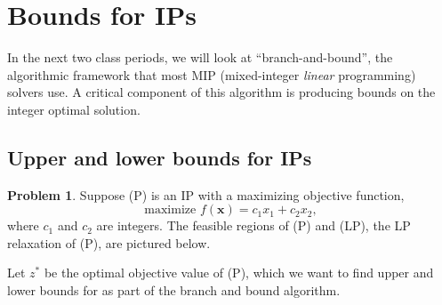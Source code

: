 \documentclass[11pt]{article}
\theoremstyle{definition}
\newtheorem{problem}{Problem}
\begin{document}
\section{Bounds for IPs}

In the next two class periods, we will look at ``branch-and-bound'', the algorithmic framework that most MIP (mixed-integer \emph{linear} programming) solvers use.  A critical component of this algorithm is producing bounds on the integer optimal solution.  

\subsection{Upper and lower bounds for IPs}
	
\begin{problem}
Suppose (P) is an IP with a maximizing objective function,
\[  \text{maximize } f(\mathbf{x}) = c_1 x_1 + c_2 x_2,  \]
where $c_1$ and $c_2$ are integers.  The feasible regions of (P) and (LP), the LP relaxation of (P), are pictured below.



\vspace{0.5cm}
\begin{center}
\begin{minipage}{6.5in}
\centering
{}
\hspace*{0.2in}
\end{minipage}
\end{center}


Let  $z^*$ be the optimal objective value of (P), which we want to find upper and lower bounds for as part of the branch and bound algorithm.


\end{problem}
\end{document}
